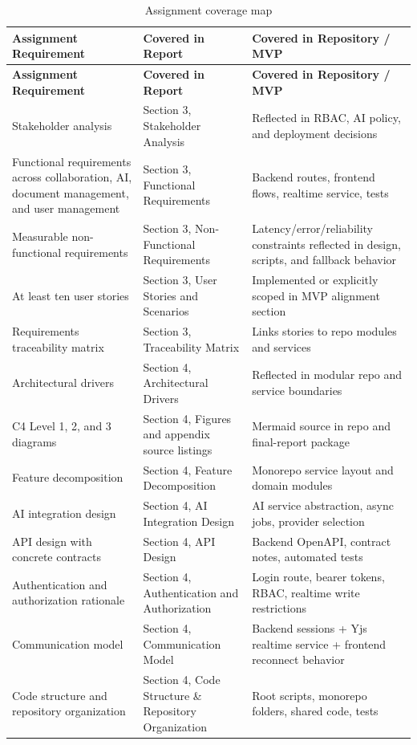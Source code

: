\begin{longtable}{p{4.1cm}p{5.0cm}p{5.2cm}}
\caption{Assignment coverage map}\label{tab:coverage-map}\\
\toprule
\textbf{Assignment Requirement} & \textbf{Covered in Report} & \textbf{Covered in Repository / MVP} \\
\midrule
\endfirsthead
\toprule
\textbf{Assignment Requirement} & \textbf{Covered in Report} & \textbf{Covered in Repository / MVP} \\
\midrule
\endhead
Stakeholder analysis & Section 3, Stakeholder Analysis & Reflected in RBAC, AI policy, and deployment decisions \\
Functional requirements across collaboration, AI, document management, and user management & Section 3, Functional Requirements & Backend routes, frontend flows, realtime service, tests \\
Measurable non-functional requirements & Section 3, Non-Functional Requirements & Latency/error/reliability constraints reflected in design, scripts, and fallback behavior \\
At least ten user stories & Section 3, User Stories and Scenarios & Implemented or explicitly scoped in MVP alignment section \\
Requirements traceability matrix & Section 3, Traceability Matrix & Links stories to repo modules and services \\
Architectural drivers & Section 4, Architectural Drivers & Reflected in modular repo and service boundaries \\
C4 Level 1, 2, and 3 diagrams & Section 4, Figures and appendix source listings & Mermaid source in repo and final-report package \\
Feature decomposition & Section 4, Feature Decomposition & Monorepo service layout and domain modules \\
AI integration design & Section 4, AI Integration Design & AI service abstraction, async jobs, provider selection \\
API design with concrete contracts & Section 4, API Design & Backend OpenAPI, contract notes, automated tests \\
Authentication and authorization rationale & Section 4, Authentication and Authorization & Login route, bearer tokens, RBAC, realtime write restrictions \\
Communication model & Section 4, Communication Model & Backend sessions + Yjs realtime service + frontend reconnect behavior \\
Code structure and repository organization & Section 4, Code Structure \& Repository Organization & Root scripts, monorepo folders, shared code, tests \\

\end{longtable}
